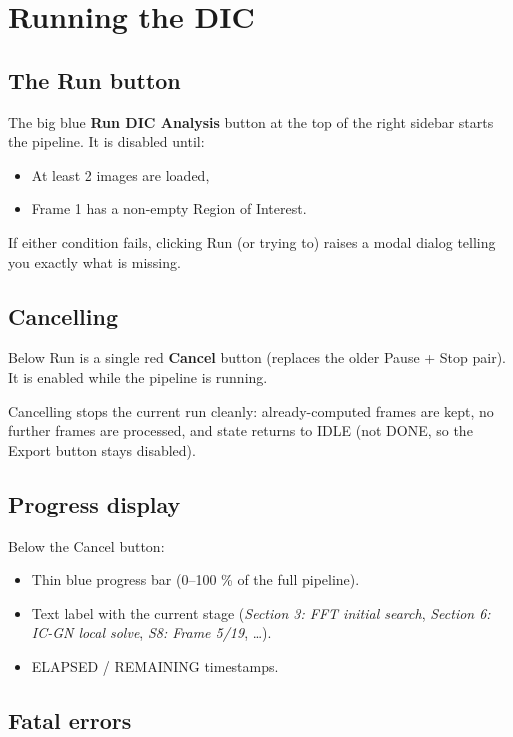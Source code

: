 \section{Running the DIC}
\label{sec:running}

\subsection{The Run button}

The big blue \textbf{Run DIC Analysis} button at the top of the
right sidebar starts the pipeline. It is disabled until:
\begin{itemize}
  \item At least 2 images are loaded,
  \item Frame 1 has a non-empty Region of Interest.
\end{itemize}

If either condition fails, clicking Run (or trying to) raises a
modal dialog telling you exactly what is missing.

\subsection{Cancelling}

Below Run is a single red \textbf{Cancel} button (replaces the older
Pause + Stop pair). It is enabled while the pipeline is running.

Cancelling stops the current run cleanly: already-computed frames
are kept, no further frames are processed, and state returns to
IDLE (not DONE, so the Export button stays disabled).

\subsection{Progress display}

Below the Cancel button:

\begin{itemize}
  \item Thin blue progress bar (0--100 \% of the full pipeline).
  \item Text label with the current stage
        (\emph{Section 3: FFT initial search},
        \emph{Section 6: IC-GN local solve},
        \emph{S8: Frame 5/19}, \ldots).
  \item ELAPSED / REMAINING timestamps.
\end{itemize}

\subsection{Fatal errors}

